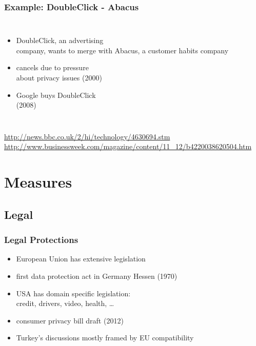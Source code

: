 \documentclass[dvipsnames]{beamer}
\theoremstyle{plain}
\begin{document}
\begin{frame}
  \frametitle{Example: DoubleClick - Abacus}

  \begin{columns}

    \begin{itemize}
      \item DoubleClick, an advertising\\
        company, wants to merge with Abacus,
        a customer habits company
      \item cancels due to pressure\\
        about privacy issues (2000)

      \pause
      \medskip
      \item Google buys DoubleClick\\
        (2008)
    \end{itemize}
  \end{columns}

  \medskip
  \tiny{\url{http://news.bbc.co.uk/2/hi/technology/4630694.stm}}\\
  \tiny{\url{http://www.businessweek.com/magazine/content/11_12/b4220038620504.htm}}\\
\end{frame}

\section{Measures}

\subsection{Legal}

\begin{frame}
  \frametitle{Legal Protections}

  \begin{itemize}
    \item European Union has extensive legislation
    \item first data protection act in Germany Hessen (1970)

    \medskip
    \item USA has domain specific legislation:\\
      credit, drivers, video, health, \ldots
    \item consumer privacy bill draft (2012)

    \medskip
    \item Turkey's discussions mostly framed by EU compatibility
  \end{itemize}
\end{frame}
\end{document}
